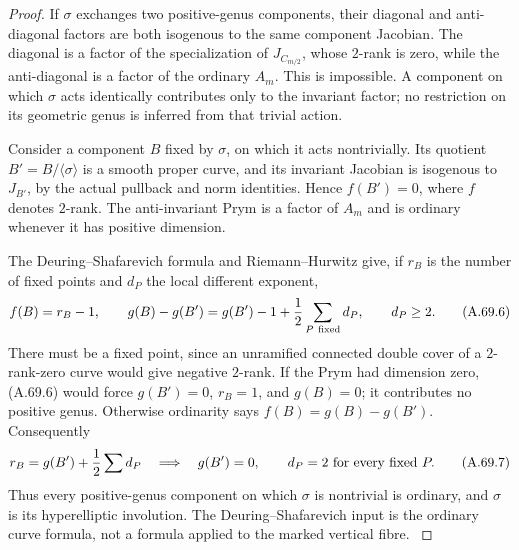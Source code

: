 \begin{proof}
If \(\sigma\) exchanges two positive-genus components, their
diagonal and anti-diagonal factors are both isogenous to the same
component Jacobian. The diagonal is a factor of the specialization
of \(J_{C_{m/2}}\), whose \(2\)-rank is zero, while the
anti-diagonal is a factor of the ordinary \(A_m\). This is
impossible. A component on which \(\sigma\) acts identically
contributes only to the invariant factor; no restriction on its
geometric genus is inferred from that trivial action.

Consider a component \(B\) fixed by \(\sigma\), on which it acts
nontrivially. Its quotient \(B'=B/\langle\sigma\rangle\) is a
smooth proper curve, and its invariant Jacobian is isogenous to
\(J_{B'}\), by the actual pullback and norm identities. Hence
\(f(B')=0\), where \(f\) denotes \(2\)-rank. The anti-invariant
Prym is a factor of \(A_m\) and is ordinary whenever it has
positive dimension.

The Deuring--Shafarevich formula and Riemann--Hurwitz give, if
\(r_B\) is the number of fixed points and \(d_P\) the local
different exponent,
\[
 f(B)=r_B-1,\qquad
 g(B)-g(B')=g(B')-1+\frac12\sum_{P\ {\rm fixed}}d_P,
 \qquad d_P\ge2.                                  \tag{A.69.6}
\]
There must be a fixed point, since an unramified connected
double cover of a \(2\)-rank-zero curve would give negative
\(2\)-rank. If the Prym had dimension zero, (A.69.6) would force
\(g(B')=0\), \(r_B=1\), and \(g(B)=0\); it contributes no
positive genus. Otherwise ordinarity says
\(f(B)=g(B)-g(B')\). Consequently
\[
      r_B=g(B')+\frac12\sum d_P
      \quad\Longrightarrow\quad
      g(B')=0,\qquad d_P=2\ \hbox{for every fixed }P.
                                                        \tag{A.69.7}
\]
Thus every positive-genus component on which \(\sigma\) is
nontrivial is ordinary, and \(\sigma\) is its hyperelliptic
involution. The Deuring--Shafarevich input is the ordinary
curve formula, not a formula applied to the marked vertical fibre.
\cite{fghCrew1984,fghYang2024}


\end{proof}
